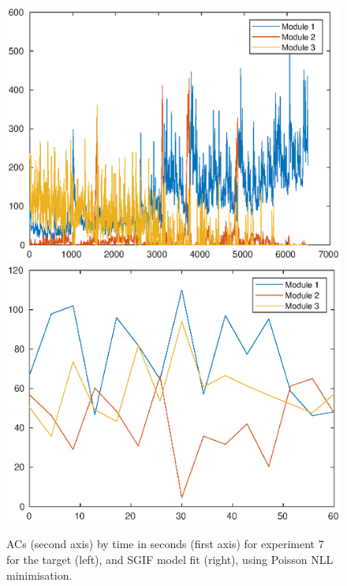 \documentclass[mphil,deptreport,ianc]{infthesis} %
\begin{document}
\begin{figure}
    \centering
    \includegraphics[width=0.8\columnwidth]{figures/sleep/ACs147.eps}
    \includegraphics[width=0.65\columnwidth]{figures/sleep/ACs_nuovo_sleep_v2_spikes_mt_microGIF_euid_12-29_02-12-29-631_exp_6_lfn_poisson_nll.eps}
    \caption{ACs (second axis) by time in seconds (first axis) for experiment 7 for the target (left), and SGIF model fit (right), using Poisson NLL minimisation.}
    \label{fig:ACs_exp7}
\end{figure}
\end{document}
